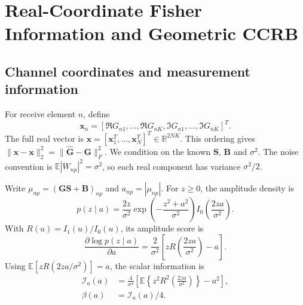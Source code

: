 \appendices
\section{Real-Coordinate Fisher Information and Geometric CCRB}
\label{app:revision-ccrb}

\subsection{Channel coordinates and measurement information}

For receive element $n$, define
\begin{equation}
\mathbf x_n=
 [\Re G_{n1},\ldots,\Re G_{nK},
  \Im G_{n1},\ldots,\Im G_{nK}]^T.
\end{equation}
The full real vector is
$\mathbf x=[\mathbf x_1^T,\ldots,\mathbf x_N^T]^T\in\mathbb R^{2NK}$.
This ordering gives
$\|\widehat{\mathbf x}-\mathbf x\|_2^2
=\|\widehat{\mathbf G}-\mathbf G\|_F^2$.
We condition on the known $\mathbf S$, $\mathbf B$ and $\sigma^2$.
The noise convention is $\mathbb E|W_{np}|^2=\sigma^2$, so each real
component has variance $\sigma^2/2$.

Write $\mu_{np}=(\mathbf G\mathbf S+\mathbf B)_{np}$ and
$a_{np}=|\mu_{np}|$. For $z\geq0$, the amplitude density is
\begin{equation}
p(z\mid a)=\frac{2z}{\sigma^2}
 \exp\!\left(-\frac{z^2+a^2}{\sigma^2}\right)
 I_0\!\left(\frac{2za}{\sigma^2}\right).
\end{equation}
With $R(u)=I_1(u)/I_0(u)$, its amplitude score is
\begin{equation}
\frac{\partial\log p(z\mid a)}{\partial a}
=\frac{2}{\sigma^2}
 \left[zR\!\left(\frac{2za}{\sigma^2}\right)-a\right].
\end{equation}
Using $\mathbb E[zR(2za/\sigma^2)]=a$, the scalar information is
\begin{align}
\mathcal I_a(a)
&=\frac{4}{\sigma^4}
 \left[\mathbb E\!\left\{z^2R^2\!\left(\frac{2za}{\sigma^2}\right)\right\}
 -a^2\right],
\label{eq:revision-scalar-information}\\
\beta(a)&=\mathcal I_a(a)/4.
\end{align}


